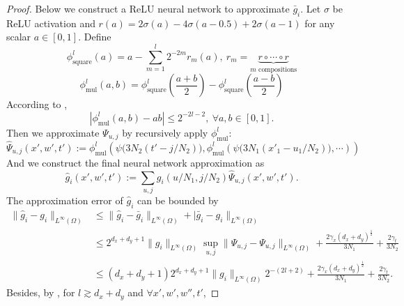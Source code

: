 \documentclass[11pt]{article}
\numberwithin{equation}{section}
\begin{document}
\begin{proof}
    Below we construct a ReLU neural network to approximate $\bar{g}_i$.
    Let $\sigma$ be ReLU activation and $r(a)=2\sigma(a)-4\sigma(a-0.5)+2\sigma(a-1)$ for any scalar $a\in[0,1]$.
    Define
    \begin{equation}
        \phi_{\text{square}}^l(a)=a-\sum_{m=1}^l2^{-2m}r_m(a),\ r_m=\underbrace{r\circ\cdots\circ r}_{m \text{ compositions}}
    \end{equation}
    \begin{equation}
        \phi_{\text{mul}}^l(a,b)=\phi_{\text{square}}^l(\frac{a+b}{2})-\phi_{\text{square}}^l(\frac{a-b}{2})
    \end{equation}
    According to \citet{yarotsky2017error}, 
    \begin{equation}
        |\phi_{\text{mul}}^l(a,b)-ab|\leq 2^{-2l-2},\ \forall a,b\in[0,1].
    \end{equation}
    Then we approximate $\Psi_{u,j}$ by recursively apply $\phi_{\text{mul}}^l$:
    \begin{equation}\label{eq:def_Psi_hat}
        \widehat{\Psi}_{u,j}(x',w',t'):=\phi_{\text{mul}}^l\left(\psi\big(3N_2(t'-j/N_2)\big),\phi_{\text{mul}}^l\left(\psi\big(3N_1(x'_1-u_1/N_2)\big),\cdots\right)\right)
    \end{equation}
    And we construct the final neural network approximation as
    \begin{equation}\label{eq:def_g_hat}
        \widehat{g}_i(x',w',t'):=\sum_{u,j}g_i(u/N_1,j/N_2)\widehat{\Psi}_{u,j}(x',w',t').
    \end{equation}
    The approximation error of $\widehat{g}_i$ can be bounded by
    \begin{equation}
        \begin{aligned}
            \|\widehat{g}_i-g_i\|_{L^\infty(\Omega)}
            &\leq \|\widehat{g}_i-\bar{g}_i\|_{L^\infty(\Omega)}+|\bar{g}_i-g_i\|_{L^\infty(\Omega)} \\
            &\leq 2^{d_x+d_y+1}\|g_i\|_{L^\infty(\Omega)}\sup_{u,j}\|\widehat{\Psi}_{u,j}-\Psi_{u,j}\|_{L^\infty(\Omega)}+\frac{2\gamma_x(d_x+d_y)^{\frac{1}{2}}}{3N_1}+\frac{2\gamma_t}{3N_2} \\
            &\leq (d_x+d_y+1)2^{d_x+d_y+1}\|g_i\|_{L^\infty(\Omega)}2^{-(2l+2)}+\frac{2\gamma_x(d_x+d_y)^{\frac{1}{2}}}{3N_1}+\frac{2\gamma_t}{3N_2}.
        \end{aligned}
    \end{equation}
    Besides, by \citet[Lemma 15]{chen2020distribution}, for $l\gtrsim d_x+d_y$ and $\forall x',w',w'',t'$,

\end{proof}
\end{document}
